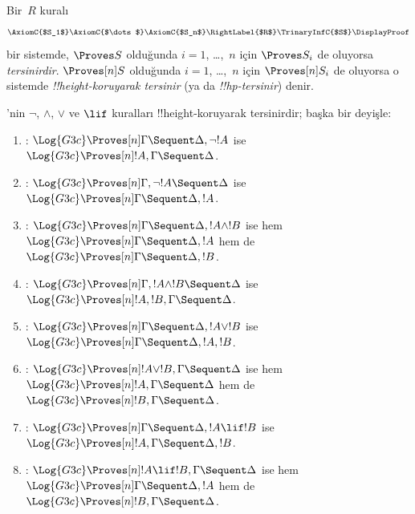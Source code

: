 



\begin{defn}
Bir~$R$ kuralı
\[
\AxiomC{$S_1$}
\AxiomC{$\dots$}
\AxiomC{$S_n$}
\RightLabel{$R$}
\TrinaryInfC{$S$}
\DisplayProof
\]
bir sistemde, $\Proves S$ olduğunda $i = 1$, \dots,~$n$ için
$\Proves S_i$ de oluyorsa \emph{tersinirdir}. $\Proves[n] S$ olduğunda
$i = 1$, \dots,~$n$ için $\Proves[n] S_i$ de oluyorsa o sistemde
\emph{!!{height}-koruyarak tersinir} (ya da \emph{!!{hp}-tersinir}) denir.
\end{defn}

\begin{lem}
'nin $\lnot$, $\land$, $\lor$ ve $\lif$ kuralları
!!{height}-koruyarak tersinirdir; başka bir deyişle:
\begin{enumerate}
  \item \RightR{\lnot}: $\Log{G3c} \Proves[n] \Gamma \Sequent
  \Delta, \lnot !A$ ise $\Log{G3c} \Proves[n] !A, \Gamma \Sequent
  \Delta$.
  \item \LeftR{\lnot}: $\Log{G3c} \Proves[n] \Gamma, \lnot !A
  \Sequent \Delta$ ise $\Log{G3c} \Proves[n] \Gamma \Sequent \Delta,
  !A$.
  \item \RightR{\land}: $\Log{G3c} \Proves[n] \Gamma \Sequent
  \Delta, !A \land !B$ ise hem $\Log{G3c} \Proves[n] \Gamma \Sequent
  \Delta, !A$ hem de $\Log{G3c} \Proves[n] \Gamma \Sequent
  \Delta, !B$.
  \item \LeftR{\land}: $\Log{G3c} \Proves[n] \Gamma, !A \land !B
  \Sequent \Delta$ ise $\Log{G3c} \Proves[n] !A, !B, \Gamma \Sequent
  \Delta$.
  \item \RightR{\lor}: $\Log{G3c} \Proves[n] \Gamma \Sequent
  \Delta, !A \lor !B$ ise $\Log{G3c} \Proves[n] \Gamma \Sequent
  \Delta, !A, !B$.
  \item \LeftR{\lor}: $\Log{G3c} \Proves[n] !A \lor !B, \Gamma
  \Sequent \Delta$ ise hem $\Log{G3c} \Proves[n] !A, \Gamma \Sequent
  \Delta$ hem de $\Log{G3c} \Proves[n] !B, \Gamma \Sequent \Delta$.
  \item \RightR{\lif}: $\Log{G3c} \Proves[n] \Gamma \Sequent
  \Delta, !A \lif !B$ ise $\Log{G3c} \Proves[n] !A, \Gamma \Sequent
  \Delta, !B$.
  \item \LeftR{\lif}: $\Log{G3c} \Proves[n] !A \lif !B, \Gamma
  \Sequent \Delta$ ise hem $\Log{G3c} \Proves[n] \Gamma \Sequent
  \Delta, !A$ hem de $\Log{G3c} \Proves[n] !B, \Gamma \Sequent \Delta$.
\end{enumerate}
\end{lem}

